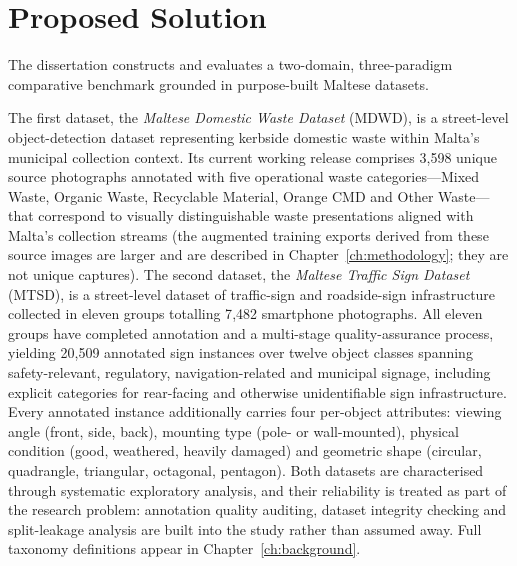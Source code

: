 \section{Proposed Solution}
\label{sec:proposed-solution}

The dissertation constructs and evaluates a two-domain, three-paradigm comparative benchmark grounded in purpose-built Maltese datasets.

The first dataset, the \emph{Maltese Domestic Waste Dataset} (MDWD), is a street-level object-detection dataset representing kerbside domestic waste within Malta's municipal collection context. Its current working release comprises 3{,}598 unique source photographs annotated with five operational waste categories---Mixed Waste, Organic Waste, Recyclable Material, Orange CMD and Other Waste---that correspond to visually distinguishable waste presentations aligned with Malta's collection streams (the augmented training exports derived from these source images are larger and are described in Chapter~\ref{ch:methodology}; they are not unique captures). The second dataset, the \emph{Maltese Traffic Sign Dataset} (MTSD), is a street-level dataset of traffic-sign and roadside-sign infrastructure collected in eleven groups totalling 7{,}482 smartphone photographs. All eleven groups have completed annotation and a multi-stage quality-assurance process, yielding 20{,}509 annotated sign instances over twelve object classes spanning safety-relevant, regulatory, navigation-related and municipal signage, including explicit categories for rear-facing and otherwise unidentifiable sign infrastructure. Every annotated instance additionally carries four per-object attributes: viewing angle (front, side, back), mounting type (pole- or wall-mounted), physical condition (good, weathered, heavily damaged) and geometric shape (circular, quadrangle, triangular, octagonal, pentagon). Both datasets are characterised through systematic exploratory analysis, and their reliability is treated as part of the research problem: annotation quality auditing, dataset integrity checking and split-leakage analysis are built into the study rather than assumed away. Full taxonomy definitions appear in Chapter~\ref{ch:background}.

